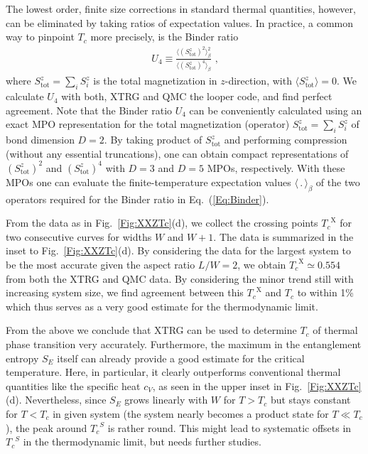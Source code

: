 \documentclass[aps,prx,twocolumn,showpacs,psfig,superscriptaddress,longbibliography]{revtex4-1}
\newcommand{\Fig}[1]{Fig.~\ref{#1}}
\def\Sztot{S^z_{\mathrm{tot}}}
\def\Tc{\ensuremath{T_c}\xspace}
\def\TcS{\ensuremath{\Tc^{S}}\xspace}
\def\TcX{\ensuremath{\Tc^{\mathrm{X}}}\xspace}
\begin{document}
The lowest order, finite size corrections in standard thermal
quantities, however, can be eliminated by taking ratios of
expectation values. In practice, a common way to pinpoint $\Tc$ more
precisely, is the Binder ratio \cite{Binder-1981a,Binder-1981b}
%
\begin{eqnarray}
   U_4 \equiv
   \frac{\langle (\Sztot)^2
   \rangle_{\beta}^2}{\langle (\Sztot)^4 \rangle_{\beta}}
\text{ ,}
\label{Eq:Binder}
\end{eqnarray}
%
where $\Sztot = \sum_i S_i^z$ is the total magnetization in
$z$-direction, with $\langle \Sztot \rangle =0$.  We calculate $U_4$
with both, XTRG and QMC the looper code, and find perfect agreement.
Note that the Binder ratio $U_4$ can be conveniently calculated
using an exact MPO representation for the total magnetization
(operator) $\Sztot = \sum_i S_i^z$ of bond dimension $D=2$. By
taking product of $\Sztot$ and performing compression (without any
essential truncations), one can obtain compact representations of
$(\Sztot)^2$ and $(\Sztot)^4$ with $D=3$ and $D=5$ MPOs,
respectively. With these MPOs one can evaluate the
finite-temperature expectation values $\langle \, . \,
\rangle_{\beta}$ of the two operators required for the Binder
ratio in Eq.~(\ref{Eq:Binder}).

From the data as in \Fig{Fig:XXZTc}(d), we collect the crossing
points $\TcX$ for two consecutive curves for widths $W$ and $W+1$.
The data is summarized in the inset to \Fig{Fig:XXZTc}(d). By
considering the data for the largest system to be the most accurate
given the aspect ratio $L/W=2$, we obtain $\TcX\simeq 0.554$ from
both the XTRG and QMC data.  By considering the minor trend still
with increasing system size, we find agreement between this $\TcX$
and $\Tc$ to within 1\% which thus serves as a very good estimate
for the thermodynamic limit.

From the above we conclude that XTRG can be used to determine $\Tc$
of thermal phase transition very accurately. Furthermore, the
maximum in the entanglement entropy $S_E$ itself can already provide
a good estimate for the critical temperature. Here, in particular,
it clearly outperforms conventional thermal quantities like the
specific heat $c_V$, as seen in the upper inset in
\Fig{Fig:XXZTc}(d). Nevertheless, since $S_E$ grows linearly with
$W$ for $T>\Tc$ but stays constant for $T<\Tc$ in given system (the
system nearly becomes a product state for $T\ll \Tc$), the peak
around \TcS is rather round.  This might lead to systematic offsets
in \TcS in the thermodynamic limit, but needs further studies.
\end{document}
